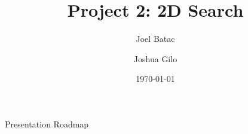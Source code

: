 \documentclass[aspectratio=169,10pt]{beamer}
\title[Project 2: 2D Search]{Project 2: 2D Search}
\author{Joel Batac \and Joshua Gilo}
\date{\today}
\begin{document}
\begin{frame}
  \titlepage
\end{frame}

\begin{frame}{Presentation Roadmap}
  \tableofcontents
\end{frame}










\end{document}
